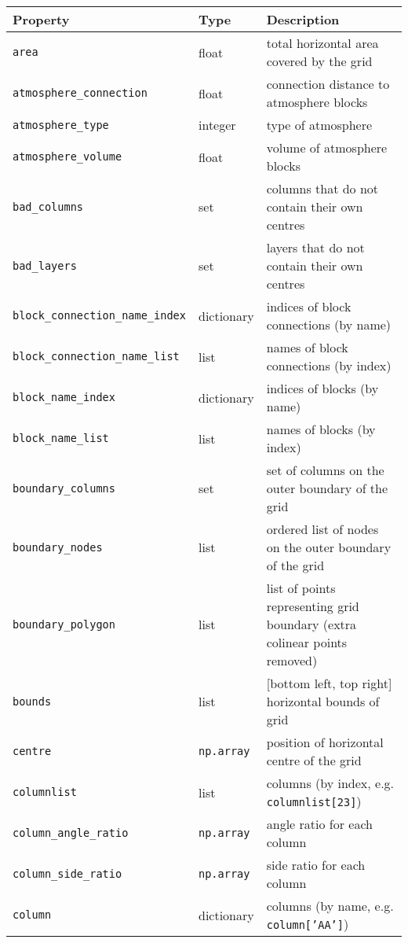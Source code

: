 \begin{center}
  \begin{longtable}{|l|l|p{75mm}|}
    \hline
    \textbf{Property} & \textbf{Type} & \textbf{Description}\\
    \hline
    \texttt{area} & float & total horizontal area covered by the grid \\
    \texttt{atmosphere\_connection} & float & connection distance to atmosphere blocks\\
    \texttt{atmosphere\_type} & integer & type of atmosphere\\
    \texttt{atmosphere\_volume} & float & volume of atmosphere blocks\\
    \texttt{bad\_columns} & set & columns that do not contain their own centres\\
    \texttt{bad\_layers} & set & layers that do not contain their own centres\\
    \texttt{block\_connection\_name\_index} & dictionary & indices of block connections (by name)\\
    \texttt{block\_connection\_name\_list} & list & names of block connections (by index)\\
    \texttt{block\_name\_index} & dictionary & indices of blocks (by name)\\
    \texttt{block\_name\_list} & list & names of blocks (by index)\\
    \texttt{boundary\_columns} & set & set of columns on the outer boundary of the grid \\
    \texttt{boundary\_nodes} & list & ordered list of nodes on the outer boundary of the grid \\
    \texttt{boundary\_polygon} & list & list of points representing grid boundary (extra colinear points removed) \\
    \texttt{bounds} & list & [bottom left, top right] horizontal bounds of grid\\
    \texttt{centre} & \texttt{np.array} & position of horizontal centre of the grid \\
    \texttt{columnlist} & list & columns (by index, e.g. \texttt{columnlist[23]})\\
    \texttt{column\_angle\_ratio} & \texttt{np.array} & angle ratio for each column\\
    \texttt{column\_side\_ratio} & \texttt{np.array} & side ratio for each column\\
    \texttt{column} & dictionary & columns (by name, e.g. \texttt{column['AA']})\\

\end{longtable}
\end{center}
